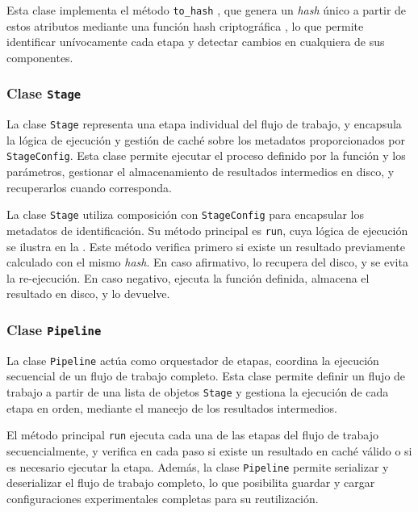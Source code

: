 Esta clase implementa el método \texttt{to\_hash} \cite{qtensor_stage}, que genera un \textit{hash} único a partir de estos atributos mediante una función hash criptográfica \cite{gauravaram2010cryptographic}, lo que permite identificar unívocamente cada etapa y detectar cambios en cualquiera de sus componentes.

\subsubsection{Clase \texttt{Stage}}

La clase \texttt{Stage} \cite{qtensor_stage} representa una etapa individual del flujo de trabajo, y encapsula la lógica de ejecución y gestión de caché sobre los metadatos proporcionados por \texttt{StageConfig}. Esta clase permite ejecutar el proceso definido por la función y los parámetros, gestionar el almacenamiento de resultados intermedios en disco, y recuperarlos cuando corresponda.

La clase \texttt{Stage} utiliza composición con \texttt{StageConfig} para encapsular los metadatos de identificación. Su método principal es \texttt{run}, cuya lógica de ejecución se ilustra en la . Este método verifica primero si existe un resultado previamente calculado con el mismo \textit{hash}. En caso afirmativo, lo recupera del disco, y se evita la re-ejecución. En caso negativo, ejecuta la función definida, almacena el resultado en disco, y lo devuelve.


\subsubsection{Clase \texttt{Pipeline}}
\label{sec:pipeline}
La clase \texttt{Pipeline} \cite{qtensor_stage} actúa como orquestador de etapas, coordina la ejecución secuencial de un flujo de trabajo completo. Esta clase permite definir un flujo de trabajo a partir de una lista de objetos \texttt{Stage} y gestiona la ejecución de cada etapa en orden, mediante el maneejo de los resultados intermedios.

El método principal \texttt{run} ejecuta cada una de las etapas del flujo de trabajo secuencialmente, y verifica en cada paso si existe un resultado en caché válido o si es necesario ejecutar la etapa. Además, la clase \texttt{Pipeline} permite serializar y deserializar el flujo de trabajo completo, lo que posibilita guardar y cargar configuraciones experimentales completas para su reutilización.

